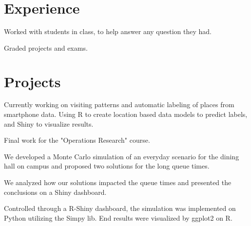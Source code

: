 \documentclass[]{deedy-resume-openfont}
\begin{document}
\begin{minipage}[t]{0.66\textwidth} 


\section{Experience}

\vspace{\topsep} %
\begin{tightemize}
\item Worked with students in class, to help answer any question they had.
\item Graded projects and exams.
\end{tightemize}
\sectionsep

\section{Projects}

\begin{tightemize}
\item Currently working on visiting patterns and
automatic labeling of places from smartphone data. Using R to create location based data models to predict labels, and Shiny to visualize results.
\end{tightemize}
\sectionsep

\begin{tightemize}
\item Final work for the "Operations Research" course.
\item We developed a Monte Carlo simulation of an everyday scenario for the dining hall on campus and proposed two solutions for the long queue times.
\item We analyzed how our solutions impacted the queue times and presented the conclusions on a Shiny dashboard.
\item Controlled through a R-Shiny dashboard, the simulation was implemented on Python utilizing the Simpy lib. End results were visualized by ggplot2 on R.
\end{tightemize}
\sectionsep


\end{minipage}
\end{document}

